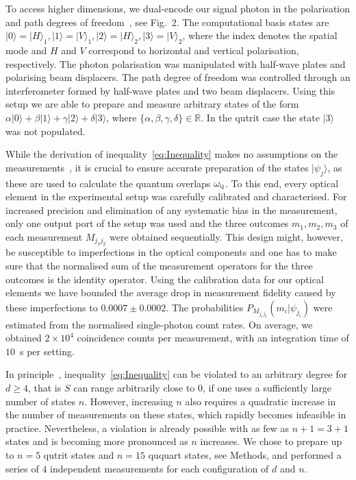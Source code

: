\documentclass[aps,prl,floatfix,onecolumn,tightenlines,amsmath,amssymb,nofootinbib,12pt]{revtex4-2}
\newcommand{\ket}[1] {| #1 \rangle}
\begin{document}
To access higher dimensions, we dual-encode our signal photon in the polarisation and path degrees of freedom~\cite{Boschi1998}, see Fig.~2. The computational basis states are $\ket{0}{=}\ket{H}_1, \ket{1}{=}\ket{V}_1, \ket{2}{=}\ket{H}_2, \ket{3}{=}\ket{V}_2$, where the index denotes the spatial mode and $H$ and $V$ correspond to horizontal and vertical polarisation, respectively. The photon polarisation was manipulated with half-wave plates and polarising beam displacers. The path degree of freedom was controlled through an interferometer formed by half-wave plates and two beam displacers. Using this setup we are able to prepare and measure arbitrary states of the form $\alpha\ket 0 + \beta \ket 1+\gamma \ket 2 +\delta \ket 3$, where $\{\alpha,\beta,\gamma,\delta\}\in\mathds{R}$. In the qutrit case the state $\ket 3$ was not populated.

While the derivation of inequality~\eqref{eq:Inequality} makes no assumptions on the measurements~\cite{Branciard2014a}, it is crucial to ensure accurate preparation of the states $\ket{\psi_j}$, as these are used to calculate the quantum overlaps $\omega_{\textsc{q}}$. To this end, every optical element in the experimental setup was carefully calibrated and characterised.
For increased precision and elimination of any systematic bias in the measurement, only one output port of the setup was used and the three outcomes $m_1,m_2,m_3$ of each measurement $M_{j_1j_2}$ were obtained sequentially. This design might, however, be susceptible to imperfections in the optical components and one has to make sure that the normalised sum of the measurement operators for the three outcomes is the identity operator.
Using the calibration data for our optical elements we have bounded the average drop in measurement fidelity caused by these imperfections to $0.0007 \pm 0.0002$. The probabilities $P_{M_{j_1j_2}}(m_i | \psi_{j_i})$ were estimated from the normalised single-photon count rates. On average, we obtained $2\times 10^4$ coincidence counts per measurement, with an integration time of $10$~s per setting.

In principle~\cite{Branciard2014a}, inequality~\eqref{eq:Inequality} can be violated to an arbitrary degree for $d\geq 4$, that is $S$ can range arbitrarily close to $0$, if one uses a sufficiently large number of states $n$.
However, increasing $n$ also requires a quadratic increase in the number of measurements on these states, which rapidly becomes infeasible in practice. 
Nevertheless, a violation is already possible with as few as $n{+}1{=}3{+}1$ states and is becoming more pronounced as $n$ increases. We chose to prepare up to $n{=}5$ qutrit states and $n{=}15$ ququart states, see Methods, and performed a series of $4$ independent measurements for each configuration of $d$ and $n$. 
\end{document}
